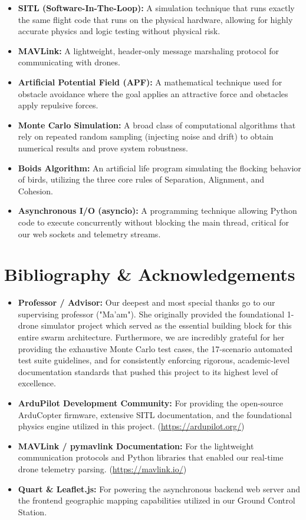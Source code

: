 \documentclass[11pt,a4paper]{article}
\begin{document}
\begin{itemize}[leftmargin=1.5em]
    \item \textbf{SITL (Software-In-The-Loop):} A simulation technique that runs exactly the same flight code that runs on the physical hardware, allowing for highly accurate physics and logic testing without physical risk.
    \item \textbf{MAVLink:} A lightweight, header-only message marshaling protocol for communicating with drones.
    \item \textbf{Artificial Potential Field (APF):} A mathematical technique used for obstacle avoidance where the goal applies an attractive force and obstacles apply repulsive forces.
    \item \textbf{Monte Carlo Simulation:} A broad class of computational algorithms that rely on repeated random sampling (injecting noise and drift) to obtain numerical results and prove system robustness.
    \item \textbf{Boids Algorithm:} An artificial life program simulating the flocking behavior of birds, utilizing the three core rules of Separation, Alignment, and Cohesion.
    \item \textbf{Asynchronous I/O (asyncio):} A programming technique allowing Python code to execute concurrently without blocking the main thread, critical for our web sockets and telemetry streams.
\end{itemize}

\section{Bibliography \& Acknowledgements}
\begin{itemize}[leftmargin=1.5em]
    \item \textbf{Professor / Advisor:} Our deepest and most special thanks go to our supervising professor ("Ma'am"). She originally provided the foundational 1-drone simulator project which served as the essential building block for this entire swarm architecture. Furthermore, we are incredibly grateful for her providing the exhaustive Monte Carlo test cases, the 17-scenario automated test suite guidelines, and for consistently enforcing rigorous, academic-level documentation standards that pushed this project to its highest level of excellence.
    \item \textbf{ArduPilot Development Community:} For providing the open-source ArduCopter firmware, extensive SITL documentation, and the foundational physics engine utilized in this project. (\url{https://ardupilot.org/})
    \item \textbf{MAVLink / pymavlink Documentation:} For the lightweight communication protocols and Python libraries that enabled our real-time drone telemetry parsing. (\url{https://mavlink.io/})
    \item \textbf{Quart \& Leaflet.js:} For powering the asynchronous backend web server and the frontend geographic mapping capabilities utilized in our Ground Control Station.
\end{itemize}
\end{document}
